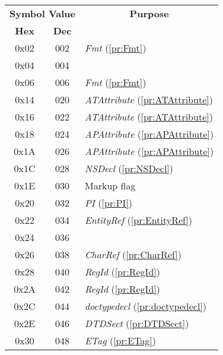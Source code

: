 \begin{table}[!hbp]
\begin{tabular}{|c|c|l|}
\hline
\multicolumn{2}{|c|}{\textbf{Symbol Value}} &
\multicolumn{1}{|c|}{\textbf{Purpose}} \\
\cline{1-2} \textbf{Hex} & \textbf{Dec} & \\ \hline \hline

0x02 & 002 &   \textit{Fmt} (\ref{pr:Fmt})\\ \hline
0x04 & 004 &   \\ \hline
0x06 & 006 &   \textit{Fmt} (\ref{pr:Fmt})\\ \hline
\hline %
0x14 & 020 &   \textit{ATAttribute} (\ref{pr:ATAttribute})\\ \hline
0x16 & 022 &   \textit{ATAttribute} (\ref{pr:ATAttribute})\\ \hline
0x18 & 024 &   \textit{APAttribute} (\ref{pr:APAttribute})\\ \hline
0x1A & 026 &   \textit{APAttribute} (\ref{pr:APAttribute})\\ \hline
0x1C & 028 &   \textit{NSDecl} (\ref{pr:NSDecl})\\ \hline
0x1E & 030 &   Markup flag\\ \hline
0x20 & 032 &   \textit{PI} (\ref{pr:PI})\\ \hline
0x22 & 034 &   \textit{EntityRef} (\ref{pr:EntityRef})\\ \hline
0x24 & 036 &   \\ \hline
0x26 & 038 &   \textit{CharRef} (\ref{pr:CharRef})\\ \hline
0x28 & 040 &   \textit{RegId} (\ref{pr:RegId})\\ \hline
0x2A & 042 &   \textit{RegId} (\ref{pr:RegId})\\ \hline
0x2C & 044 &   \textit{doctypedecl} (\ref{pr:doctypedecl})\\ \hline
0x2E & 046 &   \textit{DTDSect} (\ref{pr:DTDSect})\\ \hline
0x30 & 048 &   \textit{ETag} (\ref{pr:ETag})\\ \hline

\end{tabular}
\end{table}
